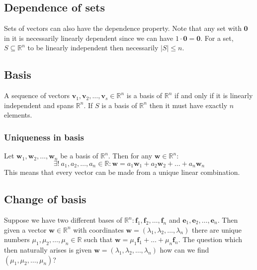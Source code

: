 \documentclass[12pt]{article}
\newcommand{\arbvec}[2]{\ensuremath{\textbf{#1}_1,\textbf{#1}_2,\dots,\textbf{#1}_{#2}}}
\newcommand{\arbreal}[2]{{#1}_1,{#1}_2,\dots,{#1}_{#2}}
\begin{document}
\subsection*{Dependence of sets}
Sets of vectors can also have the dependence property. Note that any set with \(\textbf{0}\) in it is necessarily linearly dependent since we can have \(1\cdot\textbf{0}=\textbf{0}\). For a set, \(S\subseteq\mathbb{R}^n\) to be linearly independent then necessarily \(|S|\leq n\).
\subsection*{Basis}
A sequence of vectors \(\arbvec{v}{s}\in\mathbb{R}^n\) is a basis of \(\mathbb{R}^n\) if and only if it is linearly independent and spans \(\mathbb{R}^n\). If \(S\) is a basis of \(\mathbb{R}^n\) then it must have exactly \(n\) elements.
\subsubsection*{Uniqueness in basis}
Let \(\arbvec{w}{n}\) be a basis of \(\mathbb{R}^n\). Then for any \(\textbf{w}\in\mathbb{R}^n\):
\[\exists!\ \arbreal{a}{n}\in\mathbb{R}:\textbf{w}=a_1\textbf{w}_1+a_2\textbf{w}_2+\dots+a_n\textbf{w}_n\]
This means that every vector can be made from a unique linear combination.
\subsection*{Change of basis}
Suppose we have two different bases of \(\mathbb{R}^n:\arbvec{f}{n}\) and \(\arbvec{e}{n}\). Then given a vector \(\textbf{w}\in\mathbb{R}^n\) with coordinates \(\textbf{w}=(\arbreal{\lambda}{n})\) there are unique numbers \(\arbreal{\mu}{n}\in\mathbb{R}\) such that \(\textbf{w}=\mu_1\textbf{f}_1+...+\mu_n\textbf{f}_n\). The question which then naturally arises is given \(\textbf{w}=(\arbreal{\lambda}{n})\) how can we find \((\arbreal{\mu}{n})\)?
\end{document}
